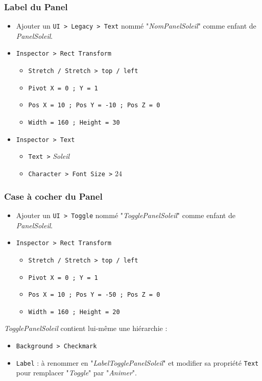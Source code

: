 \documentclass[a4paper,10pt]{article}
\newenvironment{solution}%
{\begin{tcolorbox}[breakable,colback=red!5!white,colframe=red!75!black,title=Solution]}%
{\end{tcolorbox}}
\begin{document}
\newpage 
\begin{solution}
\subsubsection{Label du Panel}
\begin{itemize}
	\item Ajouter un \texttt{UI > Legacy > Text} nommé "\textit{NomPanelSoleil}" comme enfant de \textit{PanelSoleil}.
	\item \texttt{Inspector > Rect Transform}
	\begin{itemize}
		\item \texttt{Stretch / Stretch > top / left}
			\item \texttt{Pivot X = 0 ; Y = 1}
		\item \texttt{Pos X = 10 ; Pos Y = -10 ; Pos Z = 0}
		\item \texttt{Width = 160 ; Height = 30}
	
	\end{itemize}
	
	\item \texttt{Inspector > Text}
	\begin{itemize}
		\item \texttt{Text >} \textit{Soleil}
		\item \texttt{Character > Font Size >} $24$
	\end{itemize}	
\end{itemize}

\subsubsection{Case à cocher du Panel}
\begin{itemize}
	\item Ajouter un \texttt{UI > Toggle} nommé "\textit{TogglePanelSoleil}" comme enfant de \textit{PanelSoleil}.
	\item \texttt{Inspector > Rect Transform}
	\begin{itemize}
		\item \texttt{Stretch / Stretch > top / left}
		\item \texttt{Pivot X = 0 ; Y = 1}
		\item \texttt{Pos X = 10 ; Pos Y = -50 ; Pos Z = 0}
		\item \texttt{Width = 160 ; Height = 20}	
	\end{itemize}
\end{itemize}

\textit{TogglePanelSoleil} contient lui-même une hiérarchie : 
\begin{itemize}
	\item  \texttt{Background > Checkmark}
	\item \texttt{Label} : à renommer en "\textit{LabelTogglePanelSoleil}" et modifier sa propriété \texttt{Text} pour remplacer "\textit{Toggle}" par "\textit{Animer}".
	\end{itemize}


\end{solution}
\end{document}
